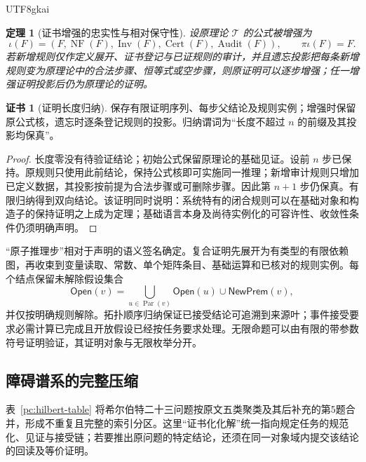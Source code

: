 \documentclass[11pt,a4paper]{article}
\theoremstyle{plain}
\newtheorem{theorem}{定理}[section]
\theoremstyle{definition}
\newtheorem*{certificate}{证书}
\theoremstyle{remark}
\begin{document}
\begin{CJK*}{UTF8}{gkai}
\begin{theorem}[证书增强的忠实性与相对保守性]
\label{pc:conservative}
设原理论 $\mathcal T$ 的公式被增强为
\[
 \iota(F)=(F,\operatorname{NF}(F),\operatorname{Inv}(F),
                  \operatorname{Cert}(F),\operatorname{Audit}(F)),
 \qquad \pi\iota(F)=F.
\]
若新增规则仅作定义展开、证书登记与已证规则的审计，并且遗忘投影把每条新增规则变为原理论中的合法步骤、恒等式或空步骤，则原证明可以逐步增强；任一增强证明投影后仍为原理论的证明。
\end{theorem}
\begin{certificate}[证明长度归纳]
保存有限证明序列、每步父结论及规则实例；增强时保留原公式核，遗忘时逐条登记规则的投影。归纳谓词为“长度不超过 $n$ 的前缀及其投影均保真”。
\end{certificate}
\begin{proof}
长度零没有待验证结论；初始公式保留原理论的基础见证。设前 $n$ 步已保持。原规则只使用此前结论，保持公式核即可实施同一推理；新增审计规则只增加已定义数据，其投影按前提为合法步骤或可删除步骤。因此第 $n+1$ 步仍保真。有限归纳得到双向结论。该证明同时说明：系统特有的闭合规则可以在基础对象和构造子的保持证明之上成为定理；基础语言本身及尚待实例化的可容许性、收敛性条件仍须明确声明。
\end{proof}

“原子推理步”相对于声明的语义签名确定。复合证明先展开为有类型的有限依赖图，再收束到变量读取、常数、单个矩阵条目、基础运算和已核对的规则实例。每个结点保留未解除假设集合
\[
 \mathsf{Open}(v)=\bigcup_{u\in\operatorname{Par}(v)}\mathsf{Open}(u)
                   \cup\mathsf{NewPrem}(v),
\]
并仅按明确规则解除。拓扑顺序归纳保证已接受结论可追溯到来源叶；事件接受要求必需计算已完成且开放假设已经按任务要求处理。无限命题可以由有限的带参数符号证明验证，其证明对象与无限枚举分开。

\subsection{障碍谱系的完整压缩}

表~\ref{pc:hilbert-table} 将希尔伯特二十三问题按原文五类聚类及其后补充的第5题合并，形成不重复且完整的索引分区。这里“证书化化解”统一指向规定任务的规范化、见证与接受链；若要推出原问题的特定结论，还须在同一对象域内提交该结论的回读及等价证明。


\end{CJK*}
\end{document}
